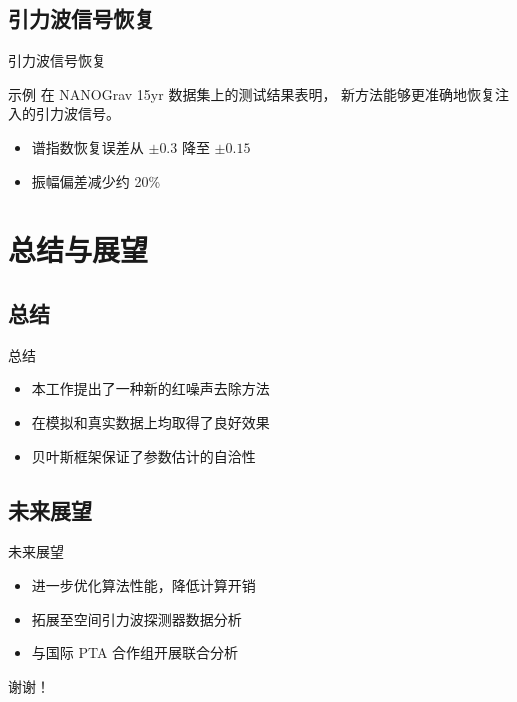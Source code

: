 \documentclass[aspectratio=169]{beamer}
\begin{document}
\subsection{引力波信号恢复}
\begin{frame}{引力波信号恢复}
  \begin{exampleblock}{示例}
    在 NANOGrav 15yr 数据集上的测试结果表明，
    新方法能够更准确地恢复注入的引力波信号。
  \end{exampleblock}

  \begin{itemize}
    \item 谱指数恢复误差从 $\pm 0.3$ 降至 $\pm 0.15$
    \item 振幅偏差减少约 20\%
  \end{itemize}
\end{frame}

\section{总结与展望}

\subsection{总结}
\begin{frame}{总结}
  \begin{itemize}
    \item 本工作提出了一种新的红噪声去除方法
    \item 在模拟和真实数据上均取得了良好效果
    \item 贝叶斯框架保证了参数估计的自洽性
  \end{itemize}
\end{frame}

\subsection{未来展望}
\begin{frame}{未来展望}
  \begin{itemize}
    \item 进一步优化算法性能，降低计算开销
    \item 拓展至空间引力波探测器数据分析
    \item 与国际 PTA 合作组开展联合分析
  \end{itemize}

  \vfill
  \centering
  {\Large\color{HUSTBlue} 谢谢！}
\end{frame}
\end{document}
